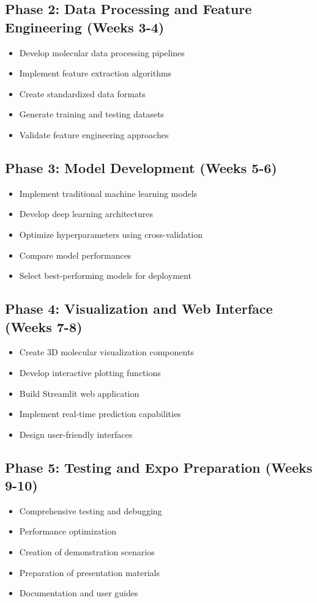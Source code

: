 \documentclass[12pt,a4paper]{article}
\begin{document}
\subsection{Phase 2: Data Processing and Feature Engineering (Weeks 3-4)}
\begin{itemize}
    \item Develop molecular data processing pipelines
    \item Implement feature extraction algorithms
    \item Create standardized data formats
    \item Generate training and testing datasets
    \item Validate feature engineering approaches
\end{itemize}

\subsection{Phase 3: Model Development (Weeks 5-6)}
\begin{itemize}
    \item Implement traditional machine learning models
    \item Develop deep learning architectures
    \item Optimize hyperparameters using cross-validation
    \item Compare model performances
    \item Select best-performing models for deployment
\end{itemize}

\subsection{Phase 4: Visualization and Web Interface (Weeks 7-8)}
\begin{itemize}
    \item Create 3D molecular visualization components
    \item Develop interactive plotting functions
    \item Build Streamlit web application
    \item Implement real-time prediction capabilities
    \item Design user-friendly interfaces
\end{itemize}

\subsection{Phase 5: Testing and Expo Preparation (Weeks 9-10)}
\begin{itemize}
    \item Comprehensive testing and debugging
    \item Performance optimization
    \item Creation of demonstration scenarios
    \item Preparation of presentation materials
    \item Documentation and user guides
\end{itemize}
\end{document}
